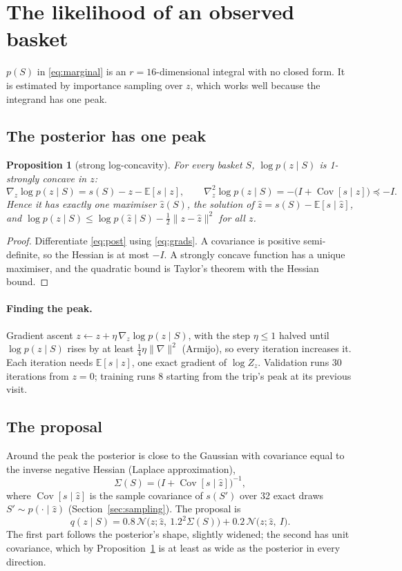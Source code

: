 \documentclass[11pt,a4paper]{article}
\newtheorem{proposition}{Proposition}
\theoremstyle{remark}
\newcommand{\N}{\mathcal N}
\newcommand{\E}{\mathbb E}
\newcommand{\Cov}{\operatorname{Cov}}
\begin{document}
\section{The likelihood of an observed basket}
\label{sec:lik}

$p(S)$ in \eqref{eq:marginal} is an $r=16$-dimensional integral with no closed form. It is estimated by
importance sampling over $z$, which works well because the integrand has one peak.

\subsection{The posterior has one peak}

\begin{proposition}[strong log-concavity]\label{prop:concave}
For every basket $S$, $\log p(z\mid S)$ is 1-strongly concave in $z$:
\[
\nabla_z\log p(z\mid S)=s(S)-z-\E[s\mid z],\qquad \nabla^2_z\log p(z\mid S)=-\big(I+\Cov[s\mid z]\big)\preceq-I .
\]
Hence it has exactly one maximiser $\hat z(S)$, the solution of $\hat z=s(S)-\E[s\mid\hat z]$, and
$\log p(z\mid S)\le\log p(\hat z\mid S)-\tfrac12\lVert z-\hat z\rVert^2$ for all $z$.
\end{proposition}
\begin{proof}
Differentiate \eqref{eq:post} using \eqref{eq:grads}. A covariance is positive semi-definite, so the
Hessian is at most $-I$. A strongly concave function has a unique maximiser, and the quadratic bound is
Taylor's theorem with the Hessian bound.
\end{proof}

\paragraph{Finding the peak.} Gradient ascent $z\leftarrow z+\eta\,\nabla_z\log p(z\mid S)$, with the step
$\eta\le1$ halved until $\log p(z\mid S)$ rises by at least $\tfrac14\eta\lVert\nabla\rVert^2$ (Armijo), so every
iteration increases it. Each iteration needs $\E[s\mid z]$, one exact gradient of $\log Z_z$. Validation
runs 30 iterations from $z=0$; training runs 8 starting from the trip's peak at its previous visit.

\subsection{The proposal}

Around the peak the posterior is close to the Gaussian with covariance equal to the inverse negative Hessian
(Laplace approximation),
\[
\Sigma(S)=\big(I+\Cov[s\mid\hat z]\big)^{-1},
\]
where $\Cov[s\mid\hat z]$ is the sample covariance of $s(S')$ over 32 exact draws $S'\sim p(\cdot\mid\hat z)$
(Section~\ref{sec:sampling}). The proposal is
\begin{equation}
q(z\mid S)=0.8\,\N\big(z;\hat z,\ 1.2^2\Sigma(S)\big)+0.2\,\N\big(z;\hat z,\ I\big).
\label{eq:q}
\end{equation}
The first part follows the posterior's shape, slightly widened; the second has unit covariance, which by
Proposition~\ref{prop:concave} is at least as wide as the posterior in every direction.
\end{document}
